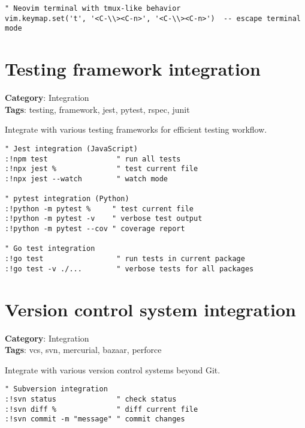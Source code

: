 {{{{{{\begin{Exa*}{}
\begin{Verbatim}[fontsize=\footnotesize, breaklines, breakanywhere]
" Neovim terminal with tmux-like behavior
vim.keymap.set('t', '<C-\\><C-n>', '<C-\\><C-n>')  -- escape terminal mode
\end{Verbatim}
\end{Exa*}

\section{Testing framework integration}

\textbf{Category}: Integration\\ \textbf{Tags}: testing, framework, jest, pytest, rspec, junit
\vspace{0.5cm}

Integrate with various testing frameworks for efficient testing workflow.

\begin{Exa*}{}
\begin{Verbatim}[fontsize=\footnotesize, breaklines, breakanywhere]
" Jest integration (JavaScript)
:!npm test                " run all tests
:!npx jest %              " test current file
:!npx jest --watch        " watch mode

" pytest integration (Python)
:!python -m pytest %     " test current file
:!python -m pytest -v    " verbose test output
:!python -m pytest --cov " coverage report

" Go test integration
:!go test                 " run tests in current package
:!go test -v ./...        " verbose tests for all packages
\end{Verbatim}
\end{Exa*}

\section{Version control system integration}

\textbf{Category}: Integration\\ \textbf{Tags}: vcs, svn, mercurial, bazaar, perforce
\vspace{0.5cm}

Integrate with various version control systems beyond Git.

\begin{Exa*}{}
\begin{Verbatim}[fontsize=\footnotesize, breaklines, breakanywhere]
" Subversion integration
:!svn status              " check status
:!svn diff %              " diff current file
:!svn commit -m "message" " commit changes


\end{Verbatim}
\end{Exa*}}}}}}}
